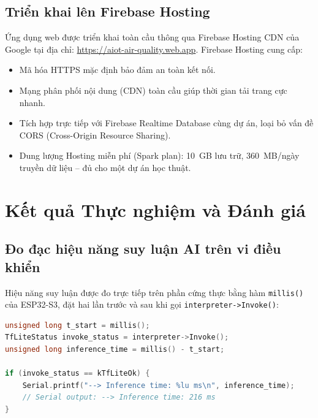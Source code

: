 \documentclass[12pt,a4paper]{article}
\begin{document}
\subsection{Triển khai lên Firebase Hosting}

Ứng dụng web được triển khai toàn cầu thông qua Firebase Hosting CDN của Google tại địa chỉ: \url{https://aiot-air-quality.web.app}. Firebase Hosting cung cấp:
\begin{itemize}
    \item Mã hóa HTTPS mặc định bảo đảm an toàn kết nối.
    \item Mạng phân phối nội dung (CDN) toàn cầu giúp thời gian tải trang cực nhanh.
    \item Tích hợp trực tiếp với Firebase Realtime Database cùng dự án, loại bỏ vấn đề CORS (Cross-Origin Resource Sharing).
    \item Dung lượng Hosting miễn phí (Spark plan): 10~GB lưu trữ, 360~MB/ngày truyền dữ liệu -- đủ cho một dự án học thuật.
\end{itemize}

\newpage

\section{Kết quả Thực nghiệm và Đánh giá}

\subsection{Đo đạc hiệu năng suy luận AI trên vi điều khiển}

Hiệu năng suy luận được đo trực tiếp trên phần cứng thực bằng hàm \texttt{millis()} của ESP32-S3, đặt hai lần trước và sau khi gọi \texttt{interpreter->Invoke()}:

\begin{lstlisting}[caption={Measuring AI inference time using millis() function}, language=C++]
unsigned long t_start = millis();
TfLiteStatus invoke_status = interpreter->Invoke();
unsigned long inference_time = millis() - t_start;

if (invoke_status == kTfLiteOk) {
    Serial.printf("--> Inference time: %lu ms\n", inference_time);
    // Serial output: --> Inference time: 216 ms
}
\end{lstlisting}
\end{document}
